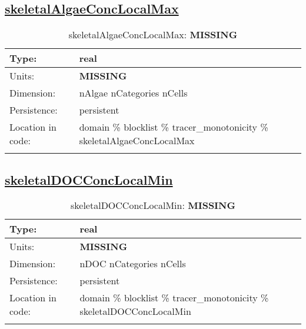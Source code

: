 \subsection[skeletalAlgaeConcLocalMax]{\hyperref[sec:var_tab_tracer_monotonicity]{skeletalAlgaeConcLocalMax}}
\label{subsec:var_sec_tracer_monotonicity_skeletalAlgaeConcLocalMax}
\begin{center}
\begin{longtable}{| p{2.0in} | p{4.0in} |}
        \hline 
        Type: & real \\
        \hline 
        Units: & {\bf \color{red} MISSING} \\
        \hline 
        Dimension: & nAlgae nCategories nCells \\
        \hline 
        Persistence: & persistent \\
        \hline 
         Location in code: & domain \% blocklist \% tracer\_monotonicity \% skeletalAlgaeConcLocalMax \\
         \hline 
    \caption{skeletalAlgaeConcLocalMax: {\bf \color{red} MISSING}}
\end{longtable}
\end{center}
\subsection[skeletalDOCConcLocalMin]{\hyperref[sec:var_tab_tracer_monotonicity]{skeletalDOCConcLocalMin}}
\label{subsec:var_sec_tracer_monotonicity_skeletalDOCConcLocalMin}
\begin{center}
\begin{longtable}{| p{2.0in} | p{4.0in} |}
        \hline 
        Type: & real \\
        \hline 
        Units: & {\bf \color{red} MISSING} \\
        \hline 
        Dimension: & nDOC nCategories nCells \\
        \hline 
        Persistence: & persistent \\
        \hline 
         Location in code: & domain \% blocklist \% tracer\_monotonicity \% skeletalDOCConcLocalMin \\
         \hline 
    \caption{skeletalDOCConcLocalMin: {\bf \color{red} MISSING}}
\end{longtable}
\end{center}
